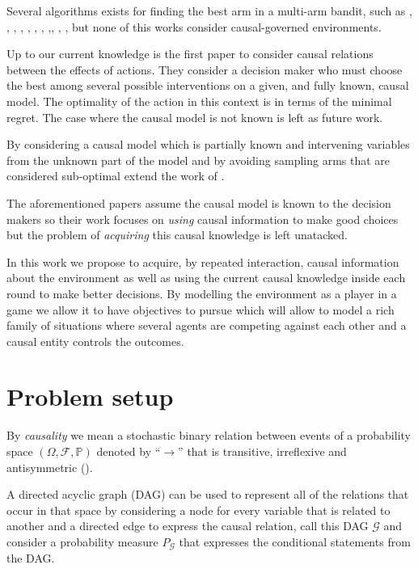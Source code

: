 \documentclass{article}
\begin{document}
Several algorithms exists for finding the best arm in a multi-arm bandit, such as \cite{bubeck2009pure}, \cite{audibert2010best}, \cite{gabillon2012best}, \cite{agarwal2014taming} , \cite{jamieson2014lil},  \cite{jamieson2014best},  \cite{ortega2014generalized}, \cite{chen2015optimal},\cite{carpentier2016tight},  \cite{russo2016simple},  \cite{kaufmann2016complexity}, but none of this works consider causal-governed environments.

Up to our current knowledge \cite{lattimoreNIPS2016} is the first paper to consider causal relations between the effects of actions. They consider a decision maker who must choose the best among several possible interventions on a given, and fully known, causal model. The optimality of the action in this context is in terms of the minimal regret. The case where the causal model is not known is left as future work.

By considering a causal model which is partially known and intervening variables from the unknown part of the model and by avoiding sampling arms that are considered sub-optimal \cite{sen2017identifying} extend the work of \cite{lattimoreNIPS2016}.

The aforementioned papers assume the causal model is known to the decision makers so their work focuses on \textit{using} causal information to make good choices but the problem of \textit{acquiring} this causal knowledge is left unatacked.

In this work we propose to acquire, by repeated interaction, causal information about the environment as well as using the current causal knowledge inside each round to make better decisions. By modelling the environment as a player in a game we allow it to have objectives to pursue which will allow to model a rich family of situations where several agents are competing against each other and a causal entity controls the outcomes. 
\section{Problem setup}
By \textit{causality} we mean a stochastic binary relation between events of a probability space $(\Omega, \mathcal{F}, \mathbb{P})$ denoted by $“\to”$ that is transitive, irreflexive and antisymmetric (\cite{spirtes2000causation}). 

A directed acyclic graph (DAG) can be used to represent all of the relations that occur in that space by considering a node for every variable that is related to another and a directed edge to express the causal relation, call this DAG $\mathcal{G}$ and consider a probability measure $P_{\mathcal{G}}$ that expresses the conditional statements from the DAG. 
\end{document}
